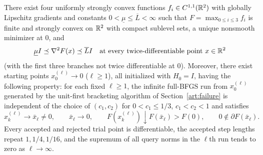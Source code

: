 \begin{theorem}
\label{art:local-failure-lower}
There exist four uniformly strongly convex functions $f_i\in C^{1,1}(\mathbb R^2)$ with
globally Lipschitz gradients and constants $0<\underline\mu\le\overline L<\infty$
such that $F=\max_{0\le i\le3}f_i$ is finite and strongly convex on $\mathbb R^2$ with
compact sublevel sets, a unique nonsmooth minimizer at $0$, and
\[
 \underline\mu I\preceq\nabla^2F(x)\preceq\overline L I
 \quad\text{at every twice-differentiable point }x\in\mathbb R^2
\]
(with the first three branches not twice differentiable at $0$). Moreover, there
exist starting points $x_0^{(\ell)}\to0$ ($\ell\ge1$), all initialized with
$H_0=I$, having the following property: for each fixed $\ell\ge1$, the infinite
full-BFGS run from $x_0^{(\ell)}$ generated by the unit-first bracketing
algorithm of Section~\ref{art:failure} is independent of the choice of
$(c_1,c_2)$ for $0<c_1\le1/3$, $c_1<c_2<1$ and satisfies
\[
 x_k^{(\ell)}\longrightarrow\bar x_\ell\ne0,\qquad
 \bar x_\ell\longrightarrow0,\qquad
 F(x_k^{(\ell)})\downarrow F(\bar x_\ell)>F(0),\qquad
 0\notin\partial F(\bar x_\ell).
\]
Every accepted and rejected trial point is differentiable, the accepted step
lengths repeat $1,1/4,1/16$, and the supremum of all query norms in the
$\ell$th run tends to zero as $\ell\to\infty$.
\end{theorem}
